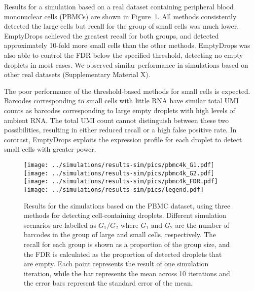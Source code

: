 \documentclass[10pt,letterpaper]{article}
\begin{document}
Results for a simulation based on a real dataset containing peripheral blood mononuclear cells (PBMCs) are shown in Figure~\ref{fig:simpbmc}.
All methods consistently detected the large cells but recall for the group of small cells was much lower.
EmptyDrops achieved the greatest recall for both groups, and detected approximately 10-fold more small cells than the other methods.
EmptyDrops was also able to control the FDR below the specified threshold, detecting no empty droplets in most cases. 
We observed similar performance in simulations based on other real datasets (Supplementary Material X).

The poor performance of the threshold-based methods for small cells is expected.
Barcodes corresponding to small cells with little RNA have similar total UMI counts as barcodes corresponding to large empty droplets with high levels of ambient RNA.
The total UMI count cannot distinguish between these two possibilities, resulting in either reduced recall or a high false positive rate.
In contrast, EmptyDrops exploits the expression profile for each droplet to detect small cells with greater power.

\begin{figure}[bt]
    \begin{center}
        \texttt{[image: ../simulations/results-sim/pics/pbmc4k\_G1.pdf]}
        \texttt{[image: ../simulations/results-sim/pics/pbmc4k\_G2.pdf]}
        \texttt{[image: ../simulations/results-sim/pics/pbmc4k\_FDR.pdf]}
        \texttt{[image: ../simulations/results-sim/pics/legend.pdf]}
    \end{center}
\caption{Results for the simulations based on the PBMC dataset, using three methods for detecting cell-containing droplets.    
Different simulation scenarios are labelled as $G_1/G_2$ where $G_1$ and $G_2$ are the number of barcodes in the group of large and small cells, respectively.
The recall for each group is shown as a proportion of the group size, and the FDR is calculated as the proportion of detected droplets that are empty.
Each point represents the result of one simulation iteration, while the bar represents the mean across 10 iterations and the error bars represent the standard error of the mean.
}
\label{fig:simpbmc}
\end{figure}
\end{document}
